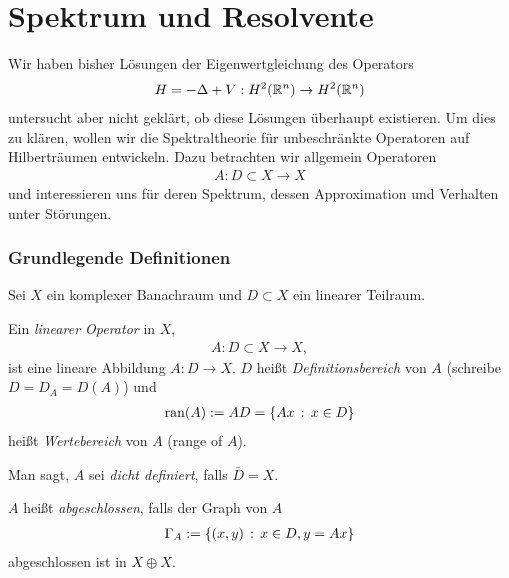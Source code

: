 \chapter{Spektrum und Resolvente}

Wir haben bisher Lösungen der Eigenwertgleichung des Operators
\begin{align*}
H = -\Delta + V : H^2(\mathbb{R}^n)\to H^2(\mathbb{R}^n)
\end{align*}
untersucht aber nicht geklärt, ob diese Lösungen überhaupt existieren. Um dies
zu klären, wollen wir die Spektraltheorie für unbeschränkte Operatoren auf
Hilberträumen entwickeln. Dazu betrachten wir allgemein Operatoren
\begin{align*}
A: D\subset X \to X
\end{align*}
und interessieren uns für deren Spektrum, dessen Approximation und Verhalten
unter Störungen.

\subsection{Grundlegende Definitionen}

Sei $X$ ein komplexer Banachraum und $D \subset X$ ein linearer
Teilraum. 

\begin{defn*}
\begin{defnenum}
\item
Ein \emph{linearer Operator} in $X$,
\begin{align*}
A : D \subset X \to X,
\end{align*}
ist eine lineare Abbildung $A : D \to X$. $D$ heißt
\emph{Definitionsbereich} von $A$ (schreibe $D = D_A = D(A)$)
und
\begin{align*}
\operatorname{ran} (A) := AD =\left\{ Ax\,:\,x \in D\right\}
\end{align*}
heißt \emph{Wertebereich} von $A$ (range of $A$).
\item
Man sagt, $A$ sei \emph{dicht definiert}, falls
$\bar{D}=X$.
\item
$A$ heißt \emph{abgeschlossen}, falls der Graph von
$A$
\begin{align*}
\Gamma_A:=\left\{ (x,y)\,:\,x \in D, y=Ax\right\}
\end{align*}
abgeschlossen ist in $X \oplus X$.\fishhere
\end{defnenum}
\end{defn*}

